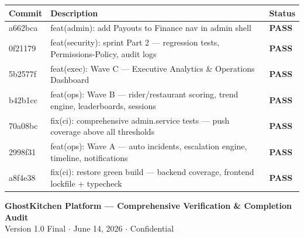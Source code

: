 \documentclass[11pt,a4paper]{article}
\newcommand{\PASS}{\colorbox{successgreen!20}{\color{successgreen}\bfseries\small PASS}}
\begin{document}
\begin{tabularx}{\textwidth}{@{}p{2.5cm}Xp{2cm}@{}}
\toprule
\rowcolor{navyblue}
\color{white}\bfseries Commit & \color{white}\bfseries Description & \color{white}\bfseries Status \\
\midrule
a662bca & feat(admin): add Payouts to Finance nav in admin shell & \PASS \\
\rowcolor{rowalt}
0f21179 & feat(security): sprint Part 2 — regression tests, Permissions-Policy, audit logs & \PASS \\
5b2577f & feat(exec): Wave C — Executive Analytics \& Operations Dashboard & \PASS \\
\rowcolor{rowalt}
b42b1cc & feat(ops): Wave B — rider/restaurant scoring, trend engine, leaderboards, sessions & \PASS \\
70a08bc & fix(ci): comprehensive admin.service tests — push coverage above all thresholds & \PASS \\
\rowcolor{rowalt}
2998f31 & feat(ops): Wave A — auto incidents, escalation engine, timeline, notifications & \PASS \\
a8f4e38 & fix(ci): restore green build — backend coverage, frontend lockfile + typecheck & \PASS \\
\bottomrule
\end{tabularx}

\vspace{16pt}

\begin{center}

\vspace{8pt}
{\color{navyblue}\small\bfseries GhostKitchen Platform — Comprehensive Verification \& Completion Audit}\\
{\color{midgray}\small Version 1.0 Final $\cdot$ June 14, 2026 $\cdot$ Confidential}
\end{center}
\end{document}
